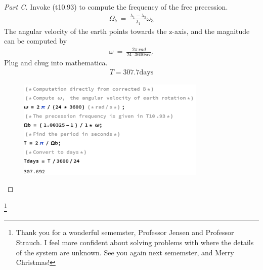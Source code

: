 \documentclass{article}
\numberwithin{equation}{section}
\begin{document}
\begin{proof}[Part C]
    Invoke (t10.93) to compute the frequency of the free precession. 
    \begin{align}
        \Omega_b \ = \ \frac{\lambda_1 - \lambda_3}{\lambda_1} \omega_3
    \end{align}
    The angular velocity of the earth points towards the z-axis, and 
    the magnitude can be computed by 
    \begin{align}
        \omega \ = \ \frac{2\pi \ rad}{24\cdot 3600 sec}. 
    \end{align}
    Plug and chug into mathematica. 
    \begin{align}\boxed{
        T = 307.7 \text{days}
    }
    \end{align}
    \begin{figure}[h]
        \centering
        \includegraphics[width=0.8\textwidth]{Q5_c.png} %
        \label{fig:example}
    \end{figure}
\end{proof}
\footnote{
    Thank you for a wonderful 
    sememster, Professor Jensen and 
    Professor Strauch. I feel more 
    confident about solving problems with 
    where the details of the system are unknown. 
    See you again next sememster, and Merry Christmas!
}
\end{document}
